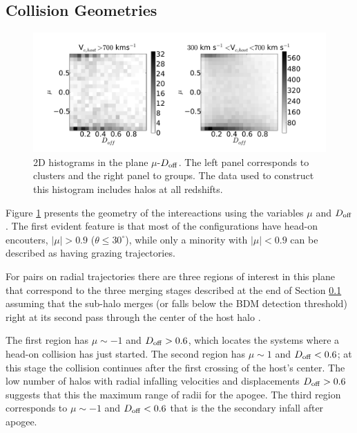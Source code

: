 \documentclass{emulateapj}
\begin{document}
\subsection{Collision Geometries}
\label{sec:geometry}

\begin{figure}
\begin{center}
\includegraphics[width=1.0\textwidth]{figure_2.pdf}
\end{center}
\caption{2D histograms in the plane $\mu$-$D_{\rm off}$. The left
  panel corresponds to clusters and the right panel to groups. The data
  used to construct this histogram includes halos at all redshifts.}
\label{fig:geometry}
\end{figure}

Figure \ref{fig:geometry} presents the geometry of the intereactions using the 
variables $\mu$ and $D_{\rm off}$. The first evident feature is that
most of the configurations have head-on encouters, $|\mu|>0.9$
($\theta\leq 30^{\circ}$), while only a minority with $|\mu|<0.9$ can
be described as having  grazing trajectories. 

For pairs on radial trajectories there are three regions of interest
in this plane that correspond to the three merging stages described
at the end of Section \ref{sec:geometry} assuming that the sub-halo
merges (or falls below the BDM detection threshold) right at its
second pass through the center of the host halo \citep{Poole2006}.  

The first region has $\mu\sim-1$ and $D_{\rm off}>0.6$, which
locates the systems where a head-on collision has just started. The
second region has $\mu\sim 1$ and $D_{\rm off}<0.6$; at this stage
the collision continues after the first crossing of the host's
center. The low number of halos with radial infalling velocities and
displacements $D_{\rm off}>0.6$ suggests that this the maximum range of
radii for the apogee.  The third region corresponds to $\mu\sim-1$
and $D_{\rm off}<0.6$ that is the the secondary infall after apogee.  
\end{document}
